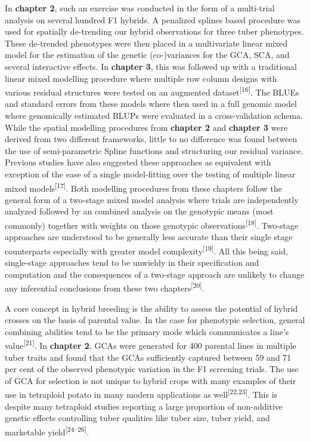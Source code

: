 In \textbf{chapter 2}, such an exercise was conducted in the form of a
multi-trial analysis on several hundred F1 hybrids. A penalized splines
based procedure was used for spatially de-trending our hybrid
observations for three tuber phenotypes. These de-trended phenotypes
were then placed in a multivariate linear mixed model for the estimation
of the genetic (co-)variances for the GCA, SCA, and several interactive
effects. In \textbf{chapter 3}, this was followed up with a traditional
linear mixed modelling procedure where multiple row column designs with
various residual structures were tested on an augmented
dataset\textsuperscript{{[}16{]}}. The BLUEs and standard errors from
these models where then used in a full genomic model where genomically
estimated BLUPs were evaluated in a cross-validation schema. While the
spatial modelling procedures from \textbf{chapter 2} and \textbf{chapter
3} were derived from two different frameworks, little to no difference
was found between the use of semi-parametric Spline functions and
structuring our residual variance. Previous studies have also suggested
these approaches as equivalent with exception of the ease of a single
model-fitting over the testing of multiple linear mixed
models\textsuperscript{{[}17{]}}. Both modelling procedures from these
chapters follow the general form of a two-stage mixed model analysis
where trials are independently analyzed followed by an combined analysis
on the genotypic means (most commonly) together with weights on those
genotypic observations\textsuperscript{{[}18{]}}. Two-stage approaches
are understood to be generally less accurate than their single
stage counterparts especially with greater model
complexity\textsuperscript{{[}19{]}}. All this being said, single-stage
approaches tend to be unwieldy in their specification and computation
and the consequences of a two-stage approach are unlikely to change any
inferential conclusions from these two
chapters\textsuperscript{{[}20{]}}.

A core concept in hybrid breeding is the ability to assess the potential
of hybrid crosses on the basis of parental value. In the case for
phenotypic selection, general combining abilities tend to be the primary
mode which communicates a line's value\textsuperscript{{[}21{]}}. In
\textbf{chapter 2}, GCAs were generated for 400 parental lines in
multiple tuber traits and found that the GCAs sufficiently captured
between 59 and 71 per cent of the observed phenotypic variation in the
F1 screening trials. The use of GCA for selection is not unique to
hybrid crops with many examples of their use in tetraploid potato in
many modern applications as well\textsuperscript{{[}22,23{]}}. This is
despite many tetraploid studies reporting a large proportion of
non-additive genetic effects controlling tuber qualities like tuber
size, tuber yield, and marketable yield\textsuperscript{{[}24--26{]}}.

